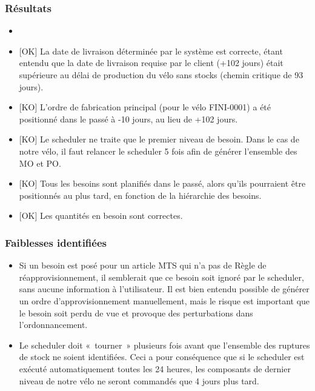 \documentclass[letterpaper,10pt,french]{sphinxmanual}
\begin{document}
\subsubsection{Résultats}
\label{\detokenize{readthedocs/tests/A1_MTS:resultats}}\begin{itemize}
\item {} 

\item {} 
{[}OK{]} La date de livraison déterminée par le système est correcte, étant entendu que la date de livraison requise par le client (+102 jours) était supérieure au délai de production du vélo sans stocks (chemin critique de 93 jours).

\item {} 
{[}KO{]} L’ordre de fabrication principal (pour le vélo FINI-0001) a été positionné dans le passé à -10 jours, au lieu de +102 jours.

\item {} 
{[}KO{]} Le scheduler ne traite que le premier niveau de besoin. Dans le cas de notre vélo, il faut relancer le scheduler 5 fois afin de générer l’ensemble des MO et PO.

\item {} 
{[}KO{]} Tous les besoins sont planifiés dans le passé, alors qu’ils pourraient être positionnés au plus tard, en fonction de la hiérarchie des besoins.

\item {} 
{[}OK{]} Les quantités en besoin sont correctes.

\end{itemize}


\subsubsection{Faiblesses identifiées}
\label{\detokenize{readthedocs/tests/A1_MTS:faiblesses-identifiees}}\begin{itemize}
\item {} 
Si un besoin est posé pour un article MTS qui n’a pas de Règle de réapprovisionnement, il semblerait que ce besoin soit ignoré par le scheduler, sans aucune information à l’utilisateur. Il est bien entendu possible de générer un ordre d’approvisionnement manuellement, mais le risque est important que le besoin soit perdu de vue et provoque des perturbations dans l’ordonnancement.

\item {} 
Le scheduler doit « tourner » plusieurs fois avant que l’ensemble des ruptures de stock ne soient identifiées. Ceci a pour conséquence que si le scheduler est exécuté automatiquement toutes les 24 heures, les composants de dernier niveau de notre vélo ne seront commandés que 4 jours plus tard.

\end{itemize}
\end{document}
